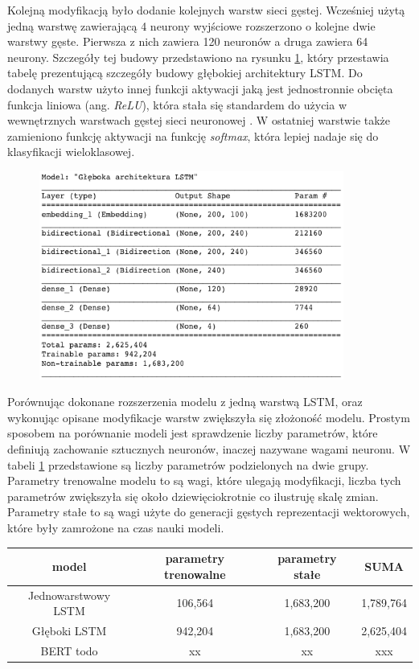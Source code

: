 Kolejną modyfikacją było dodanie kolejnych warstw sieci gęstej. Wcześniej użytą jedną warstwę zawierającą 4 neurony wyjściowe rozszerzono o kolejne dwie warstwy gęste. Pierwsza z nich zawiera 120 neuronów a druga zawiera 64 neurony. Szczegóły tej budowy przedstawiono na rysunku \ref{rys:lstm_deep_table}, który przestawia tabelę prezentującą szczegóły budowy głębokiej architektury LSTM. Do dodanych warstw użyto innej funkcji aktywacji jaką jest jednostronnie obcięta funkcja liniowa (ang. \textit{ReLU}), która stała się standardem do użycia w wewnętrznych warstwach gęstej sieci neuronowej \cite{xu2015empirical}. W ostatniej warstwie także zamieniono funkcję aktywacji na funkcję \textit{softmax}, która lepiej nadaje się do klasyfikacji wieloklasowej.

\begin{figure}[t]
\centering\includegraphics[width=10cm]{figures/reports/lstm_deep_table.png}
\label{rys:lstm_deep_table}
\end{figure}

Porównując dokonane rozszerzenia modelu z jedną warstwą LSTM, oraz wykonując opisane modyfikacje warstw zwiększyła się złożoność modelu. Prostym sposobem na porównanie modeli jest sprawdzenie liczby parametrów, które definiują zachowanie sztucznych neuronów, inaczej nazywane wagami neuronu. W tabeli \ref{tab:tabela_modele} przedstawione są liczby parametrów podzielonych na dwie grupy. Parametry trenowalne modelu to są wagi, które ulegają modyfikacji, liczba tych parametrów zwiększyła się około dziewięciokrotnie co ilustruję skalę zmian. Parametry stałe to są wagi użyte do generacji gęstych reprezentacji wektorowych, które były zamrożone na czas nauki modeli.  

\begin{table}[t]
\label{tab:tabela_modele}
\centering\footnotesize%
\begin{tabular}{c c c c}
\toprule
model & parametry trenowalne & parametry stałe & SUMA \\
\midrule
Jednowarstwowy LSTM   & 106,564 & 1,683,200 & 1,789,764 \\
Głęboki LSTM   & 942,204 & 1,683,200 & 2,625,404 \\
BERT todo   & xx & xx & xxx \\
\bottomrule
\end{tabular}
\end{table}


